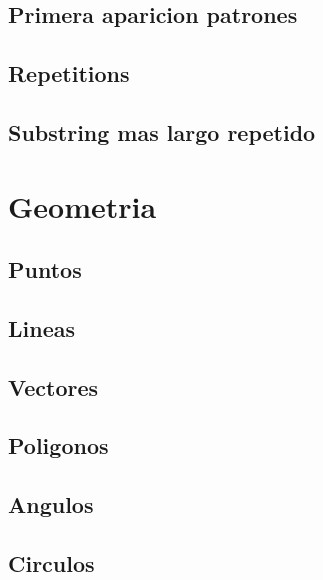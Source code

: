 \subsection{Primera aparicion patrones}
\raggedbottom
\hrulefill
\subsection{Repetitions}
\raggedbottom
\hrulefill
\subsection{Substring mas largo repetido}
\raggedbottom
\hrulefill

\section{Geometria}
\subsection{Puntos}
\raggedbottom
\hrulefill
\subsection{Lineas}
\raggedbottom
\hrulefill
\subsection{Vectores}
\raggedbottom
\hrulefill
\subsection{Poligonos}
\raggedbottom
\hrulefill
\subsection{Angulos}
\raggedbottom
\hrulefill
\subsection{Circulos}
\raggedbottom
\hrulefill
